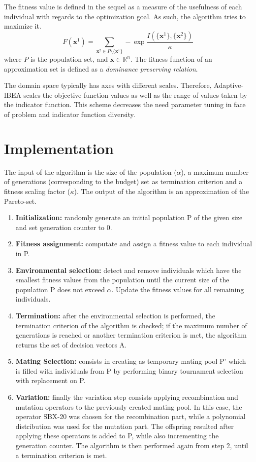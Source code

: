 \documentclass{sig-alternate}
\begin{document}
The fitness value is defined in the sequel as a measure of the usefulness of each individual with regards to the optimization goal. As such, the algorithm tries to maximize it.
$$ F(\bm{x}^1) = \sum_{\bm{x}^2 \in P \setminus \{\bm{x}^1\}} - \exp{\frac{I(\{\bm{x}^1\}, \{\bm{x}^2\})}{\kappa}}$$ where $P$ is the population set, and $\bm{x} \in \mathbb{R}^n$. The fitness function of an approximation set is defined as a \emph{dominance preserving relation}.

The domain space typically has axes with different scales. Therefore, Adaptive-IBEA scales the objective function values as well as the range of values taken by the indicator function. This scheme decreases the need parameter tuning in face of problem and indicator function diversity.

\section{Implementation}
The input of the algorithm is the size of the population ($\alpha$), a maximum number of generations (corresponding to the budget) set as termination criterion and a fitness scaling factor ($\kappa$). The output of the algorithm is an approximation of the Pareto-set.
\begin{enumerate}
\item \textbf{Initialization:} randomly generate an initial population P of the given size and set generation counter to 0.
\item \textbf{Fitness assignment:} computate and assign a fitness value to each individual in P.

\item \textbf{Environmental selection:} detect and remove individuals which have the smallest fitness values from the population until the current size of the population P does not exceed $\alpha$. Update the fitness values for all remaining individuals.

\item \textbf{Termination:} after the environmental selection is performed, the termination criterion of the algorithm is checked; if the maximum number of generations is reached or another termination criterion is met, the algorithm returns the set of decision vectors A.

\item \textbf{Mating Selection:} consists in creating as temporary mating pool P' which is filled with individuals from P by performing binary tournament selection with replacement on P.

\item \textbf{Variation:} finally the variation step consists applying recombination and mutation operators to the previously created mating pool. In this case, the operator SBX-20 was chosen for the recombination part, while a polynomial distribution was used for the mutation part.  The offspring resulted after applying these operators is added to P, while also incrementing the generation counter. The algorithm is then performed again from step 2, until a termination criterion is met.

\end{enumerate}
\end{document}
